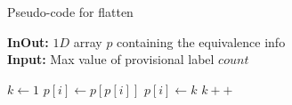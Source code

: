 \begin{algorithm}[H]
\small
{
	\caption{Pseudo-code for flatten \cite{Wu2009_LRPC}}
	\label{alg:flatten}
	\textbf{InOut:} $1D$ array $p$ containing the equivalence info \\
	\textbf{Input:} Max value of provisional label $count$
	\begin{algorithmic}[1]
		\State $k \gets 1$
				\State $p[i] \gets p[p[i]]$
			\Else
				\State $p[i] \gets k$
				\State $k++$
			\EndIf
		\EndFor
	\EndFunction
	\end{algorithmic}	
}
\end{algorithm}
